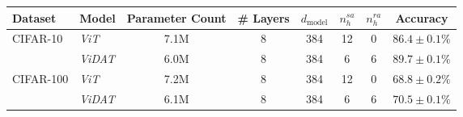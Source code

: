 \begin{tabular}{l|l|ccccc|c}
\toprule
Dataset & Model & Parameter Count & \# Layers & $d_{\text{model}}$ & $n_h^{sa}$ & $n_h^{ra}$ &  Accuracy \\
\midrule
\multirow{2}{*}{CIFAR-10} & \textit{ViT} & 7.1M & 8 & 384 & 12 & 0 &  $86.4 \pm 0.1\%$ \\
          & \textit{ViDAT} & 6.0M & 8 & 384 & 6  & 6 &  $\mathbf{89.7 \pm 0.1\%}$ \\
\hline
\multirow{2}{*}{CIFAR-100} & \textit{ViT} & 7.2M & 8 & 384 & 12 & 0 &  $68.8 \pm 0.2\%$ \\
          & \textit{ViDAT} & 6.1M & 8 & 384 & 6  & 6 &  $\mathbf{70.5 \pm 0.1\%}$ \\
\bottomrule
\end{tabular}
